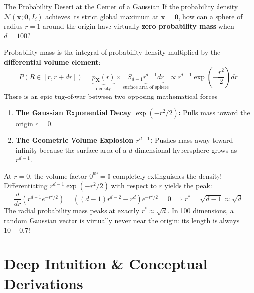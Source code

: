 \begin{ponderbox}{The Probability Desert at the Center of a Gaussian}
If the probability density $\mathcal{N}(\mathbf{x}; \mathbf{0}, I_d)$ achieves its strict global maximum at $\mathbf{x} = \mathbf{0}$, how can a sphere of radius $r = 1$ around the origin have virtually \textbf{zero probability mass} when $d = 100$?

\tcblower
Probability mass is the integral of probability density multiplied by the \textbf{differential volume element}:
\begin{equation*}
P(R \in [r, r + dr]) = \underbrace{p_\mathbf{X}(r)}_{\text{density}} \times \underbrace{S_{d-1} r^{d-1} dr}_{\text{surface area of sphere}} \propto r^{d-1} \exp\left( -\frac{r^2}{2} \right) dr
\end{equation*}
There is an epic tug-of-war between two opposing mathematical forces:
\begin{enumerate}
    \item \textbf{The Gaussian Exponential Decay $\exp(-r^2/2)$:} Pulls mass toward the origin $r = 0$.
    \item \textbf{The Geometric Volume Explosion $r^{d-1}$:} Pushes mass away toward infinity because the surface area of a $d$-dimensional hypersphere grows as $r^{d-1}$.
\end{enumerate}
At $r = 0$, the volume factor $0^{99} = 0$ completely extinguishes the density! Differentiating $r^{d-1} \exp(-r^2/2)$ with respect to $r$ yields the peak:
\begin{equation*}
\frac{d}{dr}\left( r^{d-1} e^{-r^2/2} \right) = \left( (d-1)r^{d-2} - r^d \right) e^{-r^2/2} = 0 \implies r^* = \sqrt{d - 1} \approx \sqrt{d}
\end{equation*}
The radial probability mass peaks at exactly $r^* \approx \sqrt{d}$. In 100 dimensions, a random Gaussian vector is virtually never near the origin: its length is always $10 \pm 0.7$!
\end{ponderbox}

\section{Deep Intuition \& Conceptual Derivations}

